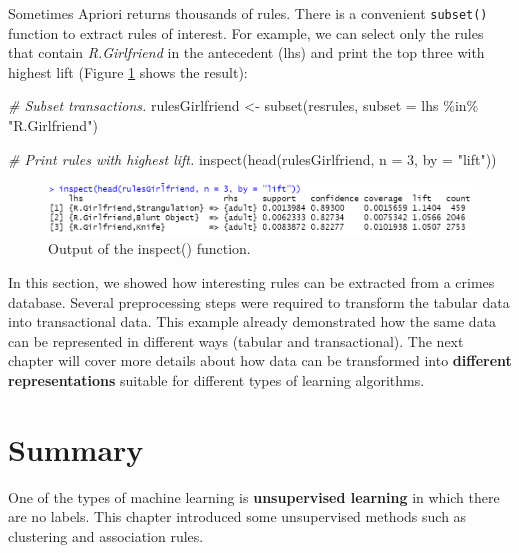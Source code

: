 \documentclass[
  11pt,
]{krantz}
\newenvironment{Shaded}{\begin{snugshade}}{\end{snugshade}}
\newcommand{\AttributeTok}[1]{\textcolor[rgb]{0.61,0.61,0.61}{#1}}
\newcommand{\CommentTok}[1]{\textcolor[rgb]{0.37,0.37,0.37}{\textit{#1}}}
\newcommand{\DecValTok}[1]{\textcolor[rgb]{0.06,0.06,0.06}{#1}}
\newcommand{\FunctionTok}[1]{\textcolor[rgb]{0,0,0}{#1}}
\newcommand{\NormalTok}[1]{#1}
\newcommand{\OtherTok}[1]{\textcolor[rgb]{0.37,0.37,0.37}{#1}}
\newcommand{\SpecialCharTok}[1]{\textcolor[rgb]{0,0,0}{#1}}
\newcommand{\StringTok}[1]{\textcolor[rgb]{0.5,0.5,0.5}{#1}}
\begin{document}
Sometimes Apriori returns thousands of rules. There is a convenient \texttt{subset()} function to extract rules of interest. For example, we can select only the rules that contain \emph{R.Girlfriend} in the antecedent (lhs) and print the top three with highest lift (Figure \ref{fig:resrulesGirlfriend} shows the result):

\begin{Shaded}
\begin{Highlighting}[]
\CommentTok{\# Subset transactions.}
\NormalTok{rulesGirlfriend }\OtherTok{\textless{}{-}} \FunctionTok{subset}\NormalTok{(resrules, }\AttributeTok{subset =}\NormalTok{ lhs }\SpecialCharTok{\%in\%} \StringTok{"R.Girlfriend"}\NormalTok{)}

\CommentTok{\# Print rules with highest lift.}
\FunctionTok{inspect}\NormalTok{(}\FunctionTok{head}\NormalTok{(rulesGirlfriend, }\AttributeTok{n =} \DecValTok{3}\NormalTok{, }\AttributeTok{by =} \StringTok{"lift"}\NormalTok{))}
\end{Highlighting}
\end{Shaded}

\begin{figure}

{\centering \includegraphics[width=1\linewidth]{images/inspectGirlfriend} 

}

\caption{Output of the inspect() function.}\label{fig:resrulesGirlfriend}
\end{figure}

In this section, we showed how interesting rules can be extracted from a crimes database. Several preprocessing steps were required to transform the tabular data into transactional data. This example already demonstrated how the same data can be represented in different ways (tabular and transactional). The next chapter will cover more details about how data can be transformed into \textbf{different representations} suitable for different types of learning algorithms.

\hypertarget{SummaryUnsupervised}{%
\section{Summary}\label{SummaryUnsupervised}}

One of the types of machine learning is \textbf{unsupervised learning} in which there are no labels. This chapter introduced some unsupervised methods such as clustering and association rules.
\end{document}

